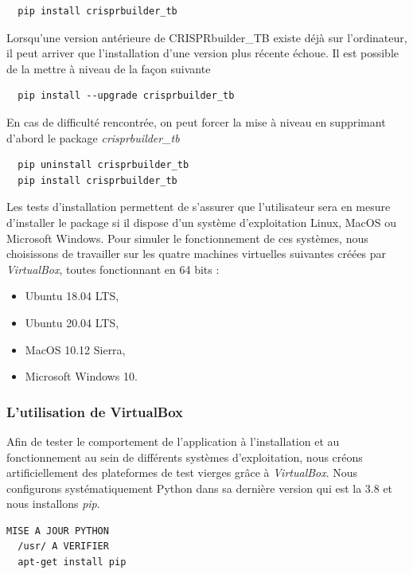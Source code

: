 \documentclass[twoside,a4paper,11pt,frenchb,openany]{report}
\begin{document}
\begin{verbatim}
  pip install crisprbuilder_tb
\end{verbatim}

Lorsqu'une version antérieure de CRISPRbuilder\_TB existe déjà sur l'ordinateur, il peut arriver que l'installation d'une version plus récente échoue. Il est possible de la mettre à niveau de la façon suivante
\begin{verbatim}
  pip install --upgrade crisprbuilder_tb
\end{verbatim}

En cas de difficulté rencontrée, on peut forcer la mise à niveau en supprimant d'abord le package \textit{crisprbuilder\_tb}
\begin{verbatim}
  pip uninstall crisprbuilder_tb
  pip install crisprbuilder_tb
\end{verbatim}

Les tests d'installation permettent de s'assurer que l'utilisateur sera en mesure d'installer le package si il dispose d'un système d'exploitation Linux, MacOS ou Microsoft Windows. Pour simuler le fonctionnement de ces systèmes, nous choisissons de travailler sur les quatre machines virtuelles suivantes créées par \textit{VirtualBox}, toutes fonctionnant en 64 bits : 
\begin{itemize}
\item Ubuntu 18.04 LTS, 
\item Ubuntu 20.04 LTS, 
\item MacOS 10.12 Sierra, 
\item Microsoft Windows 10.
\end{itemize}



\subsubsection{L'utilisation de VirtualBox}

Afin de tester le comportement de l'application à l'installation et au fonctionnement au sein de différents systèmes d'exploitation, nous créons artificiellement des plateformes de test vierges grâce à \textit{VirtualBox}. Nous configurons systématiquement Python dans sa dernière version qui est la 3.8 et nous installons \textit{pip}.

\begin{verbatim}
MISE A JOUR PYTHON
  /usr/ A VERIFIER
  apt-get install pip
\end{verbatim}
\end{document}

